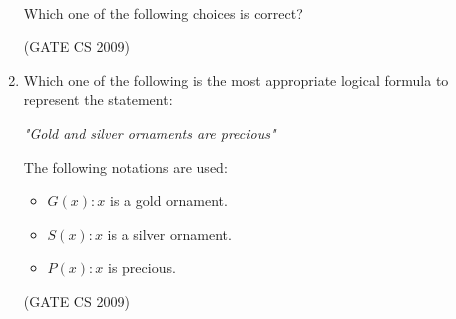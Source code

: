 \documentclass[a4paper, 11pt]{article}
\begin{document}
\begin{enumerate}
\begin{tabular}{c|cccc}
    \end{tabular}\\
    Which one of the following choices is correct?
    \begin{enumerate}
    \end{enumerate}

    \hfill (GATE CS 2009)

    \item Which one of the following is the most appropriate logical formula to represent the statement:
    \begin{center}
        \textit{"Gold and silver ornaments are precious"}
    \end{center}
    The following notations are used:

        \begin{itemize}
            \item $G(x): x$ is a gold ornament.
            \item $S(x): x$ is a silver ornament.
            \item $P(x): x$ is precious.
        \end{itemize}

    \begin{enumerate}
    \end{enumerate}

    \hfill (GATE CS 2009)


\end{enumerate}
\end{document}
